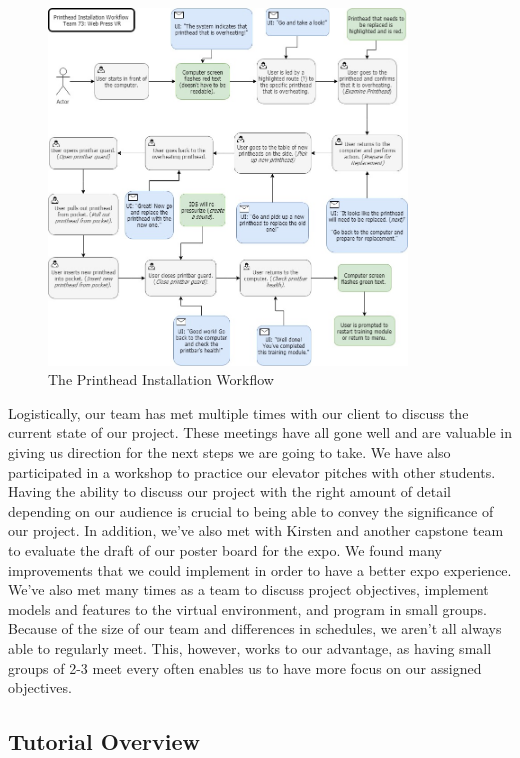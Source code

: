 \documentclass[onecolumn, draftclsnofoot,10pt, compsoc]{IEEEtran}
\begin{document}
\begin{figure}[ht!]
    \centering
    \includegraphics[width=0.85\textwidth]{PrintheadInstallationWorkflow.jpg}
    \caption{The Printhead Installation Workflow}
    \label{fig:workflow}
\end{figure}

Logistically, our team has met multiple times with our client to discuss the current state of our project. These meetings have all gone well and are valuable in giving us direction for the next steps we are going to take. We have also participated in a workshop to practice our elevator pitches with other students. Having the ability to discuss our project with the right amount of detail depending on our audience is crucial to being able to convey the significance of our project. In addition, we've also met with Kirsten and another capstone team to evaluate the draft of our poster board for the expo. We found many improvements that we could implement in order to have a better expo experience. We've also met many times as a team to discuss project objectives, implement models and features to the virtual environment, and program in small groups. Because of the size of our team and differences in schedules, we aren't all always able to regularly meet. This, however, works to our advantage, as having small groups of 2-3 meet every often enables us to have more focus on our assigned objectives. 

\subsection{Tutorial Overview}
\end{document}
